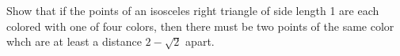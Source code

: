 Show that if the points of an isosceles right triangle of side length
1 are each colored with one of four colors, then there must be two points
of the same color whch are at least a distance $2 - \sqrt{2}$ apart.
